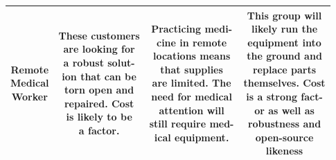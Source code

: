 \documentclass[journal]{IEEEtran}
\begin{document}
\begin{table}[H]
\begin{center}
\begin{tabular}{|c|c|c|c|}
                        \makecell[l]{Remote\\Medical\\Worker}&
                        \makecell[l]{These customers\\
                                     are looking for\\
                                     a robust solut-\\
                                     ion that can be\\
                                     torn open and \\
                                     repaired. Cost\\
                                     is likely to be\\
                                     a factor.}&
                        \makecell[l]{Practicing medi-\\
                                     cine in remote\\
                                     locations means\\
                                     that supplies \\
                                     are limited. The\\
                                     need for medical\\
                                     attention will\\
                                     still require med-\\
                                     ical equipment.}&
                        \makecell[l]{This group will\\
                                     likely run the\\
                                     equipment into\\
                                     the ground and\\
                                     replace parts \\
                                     themselves. Cost\\
                                     is a strong fact-\\
                                     or as well as \\
                                     robustness and\\
                                     open-source \\
                                     likeness}\\
                        \hline
                        

\end{tabular}
\end{center}
\end{table}
\end{document}
